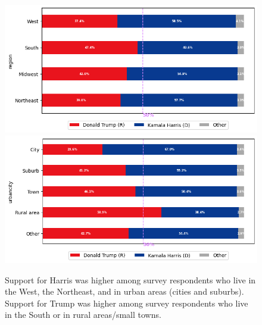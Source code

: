\documentclass[letter]{article}
\begin{document}
\begin{figure}[H]
    \centering
    \includegraphics[scale=0.42]{eda/ces24-region.png}
    \includegraphics[scale=0.42]{eda/ces24-urban_rural_divide.png}
    \caption{Support for Harris was higher among survey respondents who live in the West, the Northeast, and in urban areas (cities and suburbs). Support for Trump was higher among survey respondents who live in the South or in rural areas/small towns.}
    \label{fig:ces-geographic}
\end{figure} 
\end{document}
